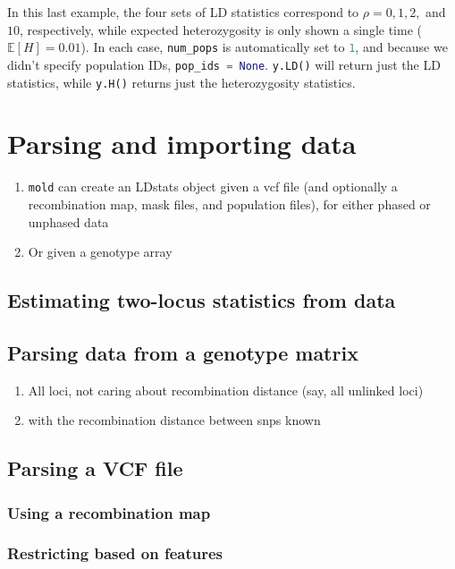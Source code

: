 \documentclass[11pt]{article}
\makeatletter
\renewcommand{\cite}{\citep}
\newcommand{\mold}{\texttt{mold}\xspace}
\newcommand{\py}[1]{\lstinline[breaklines=true,language=Python, showstringspaces=False]@#1@}
\newcommand{\E}{\mathbb{E}}
\makeatother
\begin{document}
In this last example, the four sets of LD statistics correspond to $\rho=0,1,2,$ and $10$, respectively, while expected heterozygosity is only shown a single time ($\E[H]=0.01$).
In each case, \py{num_pops} is automatically set to \py{1}, and because we didn't specify population IDs, \py{pop_ids = None}.
\py{y.LD()} will return just the LD statistics, while \py{y.H()} returns just the heterozygosity statistics.



\section{Parsing and importing data}

\begin{enumerate}
\item \mold can create an LDstats object given a vcf file (and optionally a recombination map, mask files, and population files), for either phased or unphased data
\item Or given a genotype array
\end{enumerate}




\subsection{Estimating two-locus statistics from data}
\cite{Ragsdale2019}


\subsection{Parsing data from a genotype matrix}

\begin{enumerate}
\item All loci, not caring about recombination distance (say, all unlinked loci)
\item with the recombination distance between snps known
\end{enumerate}

\subsection{Parsing a VCF file}


\subsubsection{Using a recombination map}


\subsubsection{Restricting based on features}
\end{document}
